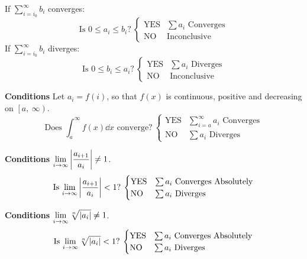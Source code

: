 \documentclass{article}
\theoremstyle{plain}
\numberwithin{theorem}{subsection}
\theoremstyle{definition}
\numberwithin{definition}{subsection}
\theoremstyle{remark}
\numberwithin{note}{subsection}
\begin{document}
\begin{multicols}{2}
\begin{mdframed}[style=exampledefaultcols,frametitle={Comparison Test}]
		\noindent If $\displaystyle \sum_{i=i_0}^\infty b_i$ converges:
		\begin{equation*}
			\text{Is $0\leqslant a_i \leqslant b_i$?}\:
			\begin{cases}
				\text{YES} & \text{$\sum a_i$ Converges} \\
				\text{NO} & \text{Inconclusive}
			\end{cases}
		\end{equation*}
		If $\displaystyle \sum_{i=i_0}^\infty b_i$ diverges:
		\begin{equation*}
			\text{Is $0\leqslant b_i \leqslant a_i$?}\:
			\begin{cases}
				\text{YES} & \text{$\sum a_i$ Diverges} \\
				\text{NO} & \text{Inconclusive}
			\end{cases}
		\end{equation*}
	\end{mdframed}
	\begin{mdframed}[style=exampledefaultcols,frametitle={Integral Test}]
		\textbf{Conditions} Let $a_i=f(i)$, so that $f(x)$ is continuous, positive and decreasing on $\left[a,\:\infty\right)$.
		\begin{equation*}
			\text{Does $\int_a^\infty f(x) \dd{x}$ converge?}\:
			\begin{cases}
				\text{YES} & \text{$\sum_{i=a}^\infty a_i$ Converges} \\
				\text{NO} & \text{$\sum a_i$ Diverges}
			\end{cases}
		\end{equation*}
	\end{mdframed}
	\begin{mdframed}[style=exampledefaultcols,frametitle={Ratio Test}]
		\textbf{Conditions} $\displaystyle \lim_{i\to\infty}\abs{\frac{a_{i+1}}{a_i}}\neq 1$.
		\begin{equation*}
			\text{Is $\lim_{i\to\infty}\abs{\frac{a_{i+1}}{a_i}} < 1$?}\:
			\begin{cases}
				\text{YES} & \text{$\sum a_i$ Converges Absolutely} \\
				\text{NO} & \text{$\sum a_i$ Diverges}
			\end{cases}
		\end{equation*}
	\end{mdframed}
	\begin{mdframed}[style=exampledefaultcols,frametitle={Root Test}]
		\textbf{Conditions} $\displaystyle \lim_{i\to\infty}\sqrt[n]{\abs{a_i}}\neq 1$.
		\begin{equation*}
			\text{Is $\lim_{i\to\infty}\sqrt[n]{\abs{a_i}} < 1$?}\:
			\begin{cases}
				\text{YES} & \text{$\sum a_i$ Converges Absolutely} \\
				\text{NO} & \text{$\sum a_i$ Diverges}
			\end{cases}
		\end{equation*}
	\end{mdframed}
\end{multicols}
\end{document}
